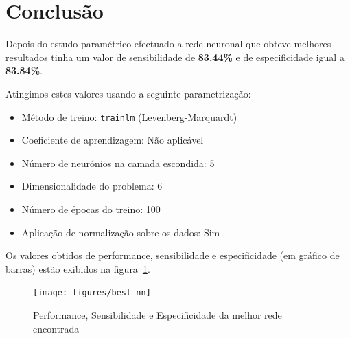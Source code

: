 \documentclass{article}
\begin{document}
\clearpage
\section{Conclusão}
\indent \indent Depois do estudo paramétrico efectuado a rede neuronal que obteve melhores resultados tinha um valor de sensibilidade de \textbf{83.44\%} e de especificidade igual a \textbf{83.84\%}.

Atingimos estes valores usando a seguinte parametrização:
\begin{itemize}
\item Método de treino: \texttt{trainlm} (Levenberg-Marquardt)
\item Coeficiente de aprendizagem: Não aplicável
\item Número de neurónios na camada escondida: 5
\item Dimensionalidade do problema: 6
\item Número de épocas do treino: 100
\item Aplicação de normalização sobre os dados: Sim
\end{itemize}

Os valores obtidos de performance, sensibilidade e especificidade (em gráfico de barras) estão exibidos na figura~\ref{best_nn}.
\begin{figure}[h!]
  \centering
  \texttt{[image: figures/best\_nn]}
  \caption{Performance, Sensibilidade e Especificidade da melhor rede encontrada}
  \label{best_nn}
\end{figure}
\end{document}
